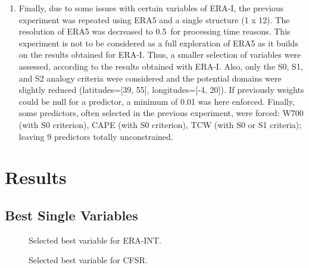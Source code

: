 \documentclass[draft]{agujournal2019}
\begin{document}
\begin{enumerate}
	\item Finally, due to some issues with certain variables of ERA-I, the previous experiment was repeated using ERA5 and a single structure (1 x 12). The resolution of ERA5 was decreased to 0.5\degree\ for processing time reasons. This experiment is not to be considered as a full exploration of ERA5 as it builds on the results obtained for ERA-I. Thus, a smaller selection of variables were assessed, according to the results obtained with ERA-I. Also, only the S0, S1, and S2 analogy criteria were considered and the potential domains were slightly reduced (latitudes=[39, 55], longitudes=[-4, 20]). If previously weights could be null for a predictor, a minimum of 0.01 was here enforced. Finally, some predictors, often selected in the previous experiment, were forced: W700 (with S0 criterion), CAPE (with S0 criterion), TCW (with S0 or S1 criteria); leaving 9 predictors totally unconstrained.
\end{enumerate}


\section{Results}
\label{results}

\subsection{Best Single Variables}
\label{best_single}



\begin{figure}[hbt]
	\noindent{}
	\caption{Selected best variable for ERA-INT.}
	\label{fig_best_era_int}
\end{figure}

\begin{figure}[hbt]
	\noindent{}
	\caption{Selected best variable for CFSR.}
	\label{fig_best_cfsr}
\end{figure}
\end{document}
